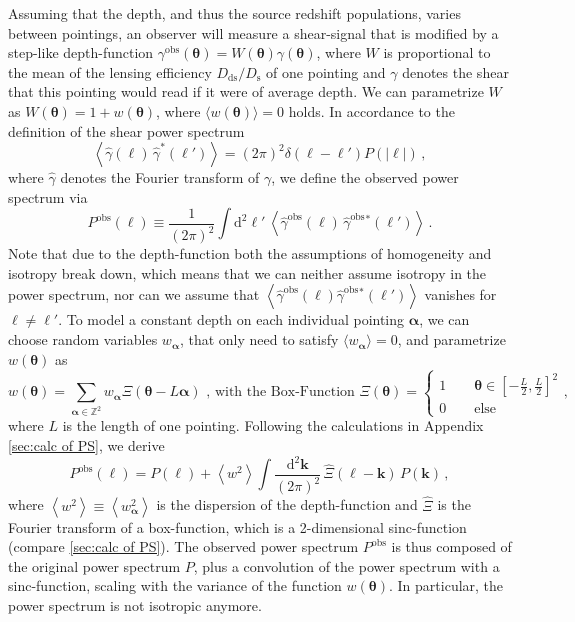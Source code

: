 \documentclass[referee]{aa} %
\renewcommand{\[}{\begin{equation}}
\renewcommand{\]}{\end{equation}}
\renewcommand{\rm}{\mathrm}
\def\b#1{\bm{#1}}
\def\Dds{D_{\rm{ds}}}
\def\Ds{D_{\rm{s}}}
\def\la{\left<}
\def\ra{\right>}
\def\gammao{\gamma^{\text{obs}}}
\def\gammaoh{\hat{\gamma}^{\text{obs}}}
\def\d{\rm{d}}
\begin{document}
Assuming that the depth, and thus the source redshift populations, varies between pointings, an observer will measure a shear-signal that is modified by a step-like depth-function $\gammao(\b\theta)=W(\b \theta)\gamma(\b\theta)$, where $W$ is proportional to the mean of the lensing efficiency $\Dds/\Ds$ of one pointing and $\gamma$ denotes the shear that this pointing would read if it were of average depth.
We can parametrize $W$ as $W(\bm{\theta}) = 1+w(\bm{\theta})$, where $\langle w(\bm{\theta})\rangle=0$ holds. 
In accordance to the definition of the shear power spectrum \begin{equation}
\la \hat{\gamma}(\b\ell)\,\hat{\gamma}^*(\b\ell')\ra = (2\pi)^2\delta(\b\ell-\b\ell')P(|\b\ell|) \, ,
\end{equation}
where $\hat{\gamma}$ denotes the Fourier transform of $\gamma$, we define the observed power spectrum via \begin{equation}
P^{\text{obs}}(\b\ell) \equiv \frac{1}{(2\pi)^2}\int \d^2 \ell'\,  \la \gammaoh(\b \ell)\, \gammaoh {}^*(\b \ell')\ra \, .
\end{equation}
Note that due to the depth-function both the assumptions of homogeneity and isotropy break down, which means that we can neither assume isotropy in the power spectrum, nor can we assume that $\la \gammaoh(\b \ell) \gammaoh {}^*(\b \ell')\ra$ vanishes for $\b\ell\neq\b\ell'$.
To model a constant depth on each individual pointing $\b \alpha$, we can choose random variables $w_{\b \alpha}$, that only need to satisfy $\langle w_{\b \alpha}\rangle=0$, and parametrize $w(\b\theta)$ as 
\begin{equation}
w(\b \theta) = \sum_{\b \alpha \in \mathbb{Z}^2} w_{\b \alpha} \Xi(\b \theta-L\b \alpha)\text{ , with the Box-Function } \Xi(\b \theta) = \begin{cases}
1 \qquad \b \theta\in \left[-\frac{L}{2},\frac{L}{2}\right]^2 \\
0 \qquad \text{else}
\end{cases},
\label{eq:defweightf}
\end{equation}
where $L$ is the length of one pointing.
Following the calculations in Appendix \ref{sec:calc of PS}, we derive 
\begin{equation}
P^{\text{obs}}(\b \ell)  =  P(\b \ell) + \la w^2\ra \int\frac{\text{d}^2\b k}{(2\pi)^2}\,\hat{\Xi}(\b \ell-\b k)\, P(\b k)\, ,
\end{equation}
where $\la w^2\ra \equiv \la w_{\b \alpha}^2\ra$ is the dispersion of the depth-function and $\hat{\Xi}$ is the Fourier transform of a box-function, which is a 2-dimensional sinc-function (compare \ref{sec:calc of PS}).
The observed power spectrum $P^{\text{obs}}$ is thus composed of the original power spectrum $P$, plus a convolution of the power spectrum with a sinc-function, scaling with the variance of the function $w(\b\theta)$. In particular, the power spectrum is not isotropic anymore.
\end{document}
